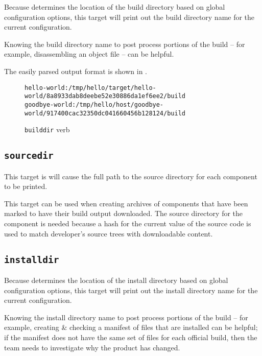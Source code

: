 Because \lmsbw determines the location of the build directory based on
global configuration options, this target will print out the build
directory name for the current configuration.

Knowing the build directory name to post process portions of the build
-- for example, disassembling an object file -- can be helpful.

The easily parsed output format is shown in
.

\begin{figure}[tbh]
\hrulefill
\begin{scriptsize}
\begin{verbatim}
hello-world:/tmp/hello/target/hello-world/8a8933dab8deebe52e30886da1ef6ee2/build
goodbye-world:/tmp/hello/host/goodbye-world/917400cac32350dc041660456b128124/build
\end{verbatim}
\end{scriptsize}
\hrulefill
\caption{\texttt{builddir} verb}\label{usinglmsbw:builddir-verb}
\end{figure}

\subsection{\texttt{sourcedir}}\label{usinglmsbw:sourcedir}

This target is will cause the full path to the source directory for
each component to be printed.

This target can be used when creating archives of components that have
been marked to have their build output downloaded.  The source
directory for the component is needed because a hash for the current
value of the source code is used to match developer's source trees
with downloadable content.

\subsection{\texttt{installdir}}\label{usinglmsbw:installdir}

Because \lmsbw determines the location of the install directory based
on global configuration options, this target will print out the
install directory name for the current configuration.

Knowing the install directory name to post process portions of the
build -- for example, creating \& checking a manifest of files that
are installed can be helpful; if the manifest does not have the same
set of files for each official build, then the \bni team needs to
investigate why the product has changed.

